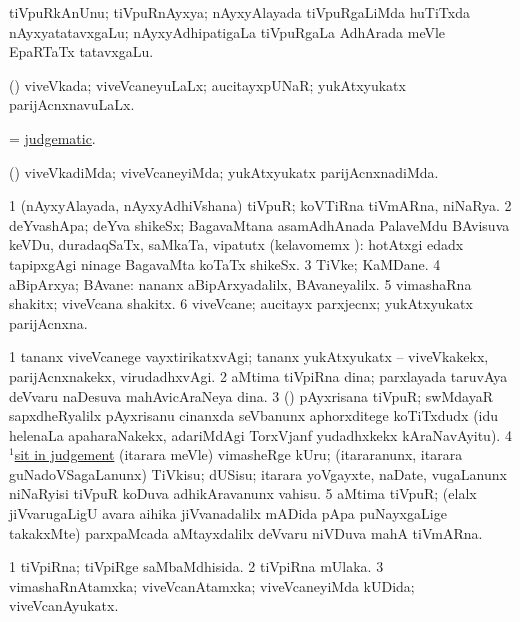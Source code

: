 \bentry
{}
\gl{\nA}
\bmng
tiVpuRkAnUnu; tiVpuRnAyxya; nAyxyAlayada tiVpuRgaLiMda huTiTxda nAyxyatatavxgaLu; nAyxyAdhipatigaLa tiVpuRgaLa AdhArada meVle EpaRTaTx tatavxgaLu. 
\emng
\eentry

\bentry
{}
\gl{\gu}
\bmng
(\AmA) viveVkada; viveVcaneyuLaLx; aucitayxpUNaR; yukAtxyukatx parijAcnxnavuLaLx. 
\emng
\eentry

\bentry
{}
\gl{\gu}
\bmng
 = \hyperlink{judgematic}{judgematic}. 
\emng
\eentry

\bentry
{}
\gl{\kirxvi}
\bmng
(\AmA) viveVkadiMda; viveVcaneyiMda; yukAtxyukatx parijAcnxnadiMda. 
\emng
\eentry

\bentry
{}
\gl{\nA}
\bmng
\bnum
\num{1} (nAyxyAlayada, nAyxyAdhiVshana) tiVpuR; koVTiRna tiVmARna, niNaRya. 
\num{2} deYvashApa; deYva shikeSx; BagavaMtana asamAdhAnada PalaveMdu BAvisuva keVDu, duradaqSaTx, saMkaTa, vipatutx (kelavomemx \hA):  hotAtxgi edadx tapipxgAgi ninage BagavaMta koTaTx shikeSx. 
\num{3} TiVke; KaMDane. 
\num{4} aBipArxya; BAvane:  nananx aBipArxyadalilx, BAvaneyalilx. 
\num{5} vimashaRna shakitx; viveVcana shakitx. 
\num{6} viveVcane; aucitayx parxjecnx; yukAtxyukatx parijAcnxna. 
\enum
\emng

\noindent
\gl{\pagu}
\bmng
\bnum
\num{1}  tananx viveVcanege vayxtirikatxvAgi; tananx yukAtxyukatx -- viveVkakekx, parijAcnxnakekx, virudadhxvAgi. 
\num{2}   aMtima tiVpiRna dina; parxlayada taruvAya deVvaru naDesuva mahAvicAraNeya dina. 
\num{3}  (\girxVpu) pAyxrisana tiVpuR; swMdayaR sapxdheRyalilx pAyxrisanu cinanxda seVbanunx aphorxditege koTiTxdudx (idu helenaLa apaharaNakekx, adariMdAgi TorxVjanf yudadhxkekx kAraNavAyitu). 
\num{4} \hyperref{kandict_s.pdf}{S}{sit(1) pagu(12)}{$^1$sit in judgement} (itarara meVle) vimasheRge kUru; (itararanunx, itarara guNadoVSagaLanunx) TiVkisu; dUSisu; itarara yoVgayxte, naDate, \mo vugaLanunx niNaRyisi tiVpuR koDuva adhikAravanunx vahisu. 
\num{5}  aMtima tiVpuR; (elalx jiVvarugaLigU avara aihika jiVvanadalilx mADida pApa puNayxgaLige takakxMte) parxpaMcada aMtayxdalilx deVvaru niVDuva mahA tiVmARna. 
\enum
\emng
\eentry

\bentry
{}
\gl{\gu}
\bmng
\bnum
\num{1} tiVpiRna; tiVpiRge saMbaMdhisida. 
\num{2} tiVpiRna mUlaka. 
\num{3} vimashaRnAtamxka; viveVcanAtamxka; viveVcaneyiMda kUDida; viveVcanAyukatx. 
\enum
\emng
\eentry

